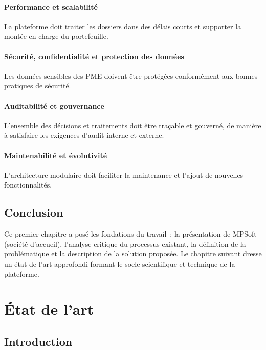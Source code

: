 \documentclass[a4paper,12pt,oneside]{report}
\begin{document}
\subsubsection{Performance et scalabilité}

La plateforme doit traiter les dossiers dans des délais courts et supporter la montée en
charge du portefeuille.

\subsubsection{Sécurité, confidentialité et protection des données}

Les données sensibles des PME doivent être protégées conformément aux bonnes pratiques de
sécurité.

\subsubsection{Auditabilité et gouvernance}

L'ensemble des décisions et traitements doit être traçable et gouverné, de manière à
satisfaire les exigences d'audit interne et externe.

\subsubsection{Maintenabilité et évolutivité}

L'architecture modulaire doit faciliter la maintenance et l'ajout de nouvelles
fonctionnalités.

\section*{Conclusion}

Ce premier chapitre a posé les fondations du travail~: la présentation de MPSoft (société
d'accueil), l'analyse critique du processus existant, la définition
de la problématique et la description de la solution proposée. Le chapitre suivant dresse
un état de l'art approfondi formant le socle scientifique et technique de la plateforme.

\chapter{État de l'art}

\section*{Introduction}
\end{document}
